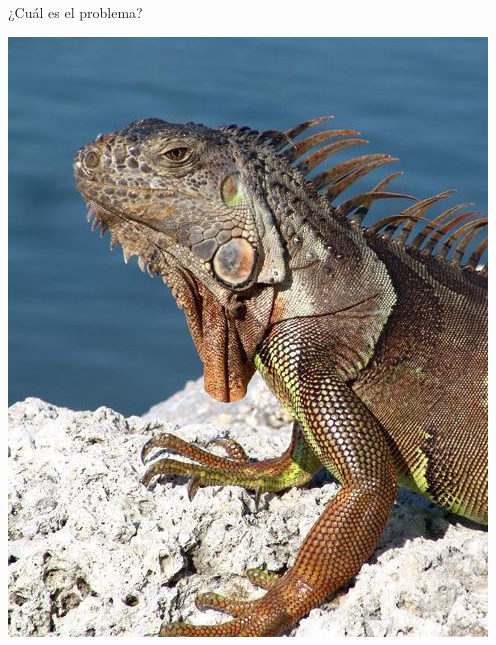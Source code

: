 \documentclass{beamer}
\begin{document}
\begin{frame}{¿Cuál es el problema?}
\begin{center}
    		{\includegraphics[scale=0.14]{imagen/iguana.jpg}}
        \end{center}

	\end{frame}
\end{document}
